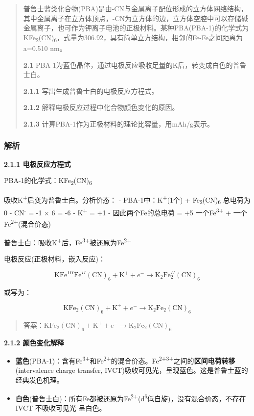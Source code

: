 \begin{quote}
普鲁士蓝类化合物(PBA)是由-CN与金属离子配位形成的立方体网络结构，其中金属离子在立方体顶点，-CN为立方体的边，立方体空腔中可以存储碱金属离子，也可作为钾离子电池的正极材料。某种PBA(PBA-1)的化学式为KFe\textsubscript{2}(CN)\textsubscript{6}，式量为306.92，具有简单立方结构，相邻的Fe-Fe之间距离为a=0.510 nm。

\textbf{2.1} PBA-1为蓝色晶体，通过电极反应吸收足量的K后，转变成白色的普鲁士白。

\textbf{2.1.1} 写出生成普鲁士白的电极反应方程式。

\textbf{2.1.2} 解释电极反应过程中化合物颜色变化的原因。

\textbf{2.1.3} 计算PBA-1作为正极材料的理论比容量，用mAh/g表示。
\end{quote}

\subsubsection{解析}\label{ux89e3ux6790-13}

\textbf{2.1.1 电极反应方程式}

PBA-1的化学式：KFe\textsubscript{2}(CN)\textsubscript{6}

吸收K\textsuperscript{+}后变为普鲁士白。分析价态：
- PBA-1中：K\textsuperscript{+}(1个) + Fe\textsubscript{2}(CN)\textsubscript{6} \箭 总电荷为0
- CN\textsuperscript{-} = -1 × 6 = -6
- K\textsuperscript{+} = +1
- 因此两个Fe的总电荷 = +5 \箭 一个Fe\textsuperscript{3+} + 一个Fe\textsuperscript{2+}(混合价态)

普鲁士白：吸收K\textsuperscript{+}后，Fe\textsuperscript{3+}被还原为Fe\textsuperscript{2+}

电极反应(正极材料，嵌入反应)：

\[\text{KFe}^{III}\text{Fe}^{II}(\text{CN})_6 + \text{K}^+ + e^- \rightarrow \text{K}_2\text{Fe}^{II}_2(\text{CN})_6\]

或写为：

\[\text{KFe}_2(\text{CN})_6 + \text{K}^+ + e^- \rightarrow \text{K}_2\text{Fe}_2(\text{CN})_6\]

\begin{quote}
答案：\(\text{KFe}_2(\text{CN})_6 + \text{K}^+ + e^- \rightarrow \text{K}_2\text{Fe}_2(\text{CN})_6\)
\end{quote}

\textbf{2.1.2 颜色变化解释}

\begin{itemize}
\tightlist
\item
  \textbf{蓝色}(PBA-1)：含有Fe\textsuperscript{3+}和Fe\textsuperscript{2+}的混合价态。Fe\textsuperscript{2+}\textsuperscript{3+}之间的\textbf{区间电荷转移}(intervalence charge transfer, IVCT)吸收可见光，呈现蓝色。这是普鲁士蓝的经典发色机理。
\item
  \textbf{白色}(普鲁士白)：所有Fe都被还原为Fe\textsuperscript{2+}(d\textsuperscript{6}低自旋)，没有混合价态，不存在IVCT \箭 不吸收可见光 \箭 呈白色。
\end{itemize}

